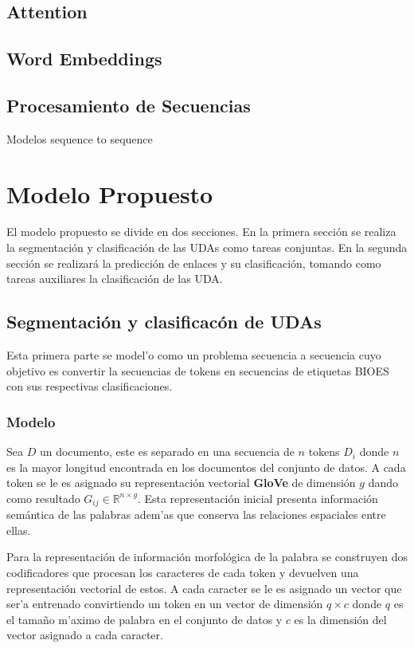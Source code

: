 \subsection{Attention}

\subsection{Word Embeddings}

\subsection{Procesamiento de Secuencias}

Modelos sequence to sequence

\section{Modelo Propuesto}

El modelo propuesto se divide en dos secciones. En la primera sección se realiza la segmentación y clasificación de 
las UDAs como tareas conjuntas. En la segunda sección se realizará la predicción de enlaces y su clasificación, tomando
como tareas auxiliares la clasificación de las UDA.

\subsection{Segmentación y clasificacón de UDAs}

Esta primera parte se model'o como un problema secuencia a secuencia cuyo objetivo es convertir la secuencias de 
tokens en secuencias de etiquetas BIOES con sus respectivas clasificaciones.

\subsubsection{Modelo}

Sea $D$ un documento, este es separado en una secuencia de $n$ tokens $D_i$ donde $n$ es la mayor longitud encontrada
en los documentos del conjunto de datos. A cada token se le es asignado
su representación vectorial \textbf{GloVe} de dimensión $g$ dando como resultado $G_{ij} \in \mathbb{R}^{n \times g}$.
Esta representación inicial presenta información semántica de las palabras adem'as que conserva las relaciones 
espaciales entre ellas. 

Para la representación de información morfológica de la palabra se construyen dos
codificadores que procesan los caracteres de cada token y devuelven una representación vectorial de estos.
A cada caracter se le es asignado un vector que ser'a entrenado convirtiendo un token en un vector de dimensión
$q \times c$ donde $q$ es el tamaño m'aximo de palabra en el conjunto de datos y $c$ es la dimensión del vector
asignado a cada caracter.

